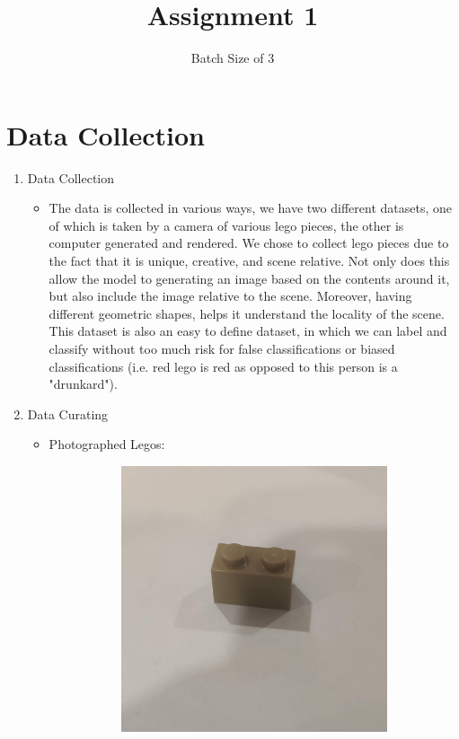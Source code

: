 \documentclass[]{article}
\title{Assignment 1}
\author{Batch Size of 3}
\begin{document}
\maketitle

\clearpage
\section{Data Collection}
\begin{enumerate}
    \item Data Collection
    \begin{itemize}
        \item The data is collected in various ways, we have two different datasets, one of which is taken by a camera of various lego pieces, the other is computer generated and rendered. We chose to collect lego pieces due to the fact that it is unique, creative, and scene relative. Not only does this allow the model to generating an image based on the contents around it, but also include the image relative to the scene. Moreover, having different geometric shapes, helps it understand the locality of the scene. This dataset is also an easy to define dataset, in which we can label and classify without too much risk for false classifications or biased classifications (i.e. red lego is red as opposed to this person is a "drunkard").
    \end{itemize}
    \item Data Curating
    \begin{itemize}
        \item Photographed Legos:
        \begin{figure}[h]
            \centering
            \begin{subfigure}[b]{0.2\textwidth}
                \centering
                \includegraphics[width=\textwidth]{IMG_20230902_133703.jpg}

\end{subfigure}
\end{figure}
\end{itemize}
\end{enumerate}
\end{document}
